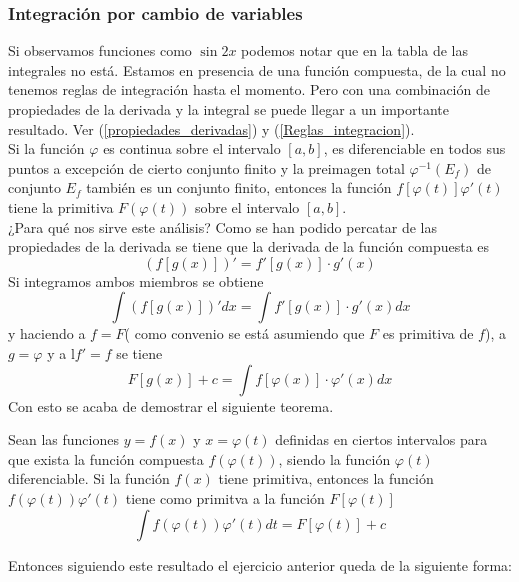 \documentclass[10pt,twoside]{SelfArx} %
\begin{document}
 \subsubsection{Integración por cambio de variables}
 Si observamos funciones como $ \sin 2x $ podemos notar que en la tabla de las integrales no est\'a. Estamos en presencia de una función compuesta, de la cual no tenemos reglas de integración hasta el momento. Pero con una combinación de propiedades de la derivada y la integral se puede llegar a un importante resultado. Ver (\ref{propiedades_derivadas}) y (\ref{Reglas_integracion}).\\
 Si la función $ \varphi $ es continua sobre el intervalo $ [a,b] $, es diferenciable en todos sus puntos a excepción de cierto conjunto finito y la preimagen total $ \varphi^{-1}(E_{f}) $ de conjunto $ E_{f} $ también es un conjunto finito, entonces la función $ f[\varphi (t)]\varphi'(t) $ tiene la primitiva $ F(\varphi(t)) $ sobre el intervalo $ [a,b] $.\\
 ¿Para qué nos sirve este análisis?
 Como se han podido percatar de las propiedades de la derivada se tiene que la derivada de  la función compuesta es 
 \[ \displaystyle(f[g(x)])'=f'[g(x)] \cdot g'(x) \]
 Si integramos ambos miembros se obtiene
 \begin{equation}
 \displaystyle\int(f[g(x)])'dx=\int f'[g(x)] \cdot g'(x)dx
 \end{equation}
 y haciendo a $ f=F $( como convenio se está asumiendo que $ F $ es primitiva de $ f $), a $ g=\varphi $ y a l$ f'=f $ se tiene
 \begin{equation}
 \displaystyle F[g(x)]+c=\int f[\varphi(x)] \cdot \varphi'(x)dx
 \end{equation}
 Con esto se acaba de demostrar el siguiente teorema.
 \begin{teorema}
 	Sean las funciones $ y=f(x) $ y $ x=\varphi(t) $ definidas en ciertos intervalos para que exista la función
 	compuesta $ f(\varphi(t)) $, siendo la función  $ \varphi(t) $ diferenciable. Si la función $ f(x) $ tiene primitiva, entonces la función $ f(\varphi(t))\varphi'(t) $ tiene como primitva a la funci\'on $ F[\varphi(t)] $
 	\begin{equation}
 	\displaystyle\int f(\varphi(t))\varphi'(t)dt=F[\varphi(t)]+c
 	\end{equation}
 \end{teorema}
 Entonces siguiendo este resultado el ejercicio anterior queda de la siguiente forma:
\end{document}
